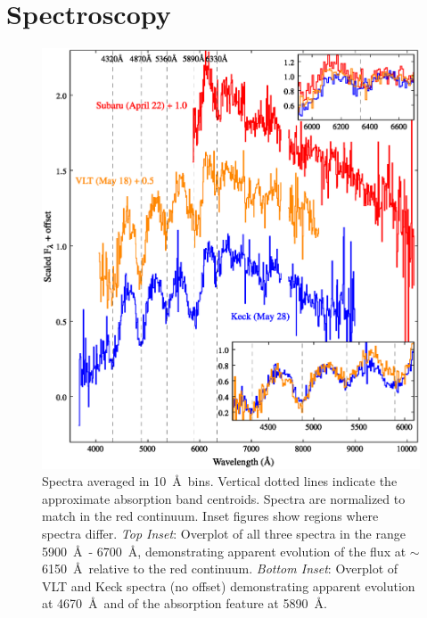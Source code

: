 \section{Spectroscopy} \label{sec:f6_spec}

\begin{figure}
\begin{center}
\includegraphics[width=\textwidth]{figures/scp06f6/spectra.eps}
\end{center}
\caption[Spectroscopy of SN SCP06F6]{Spectra averaged in
  10~\AA\ bins. Vertical dotted lines indicate the approximate
  absorption band centroids. Spectra are normalized to match in the
  red continuum. Inset figures show regions where spectra differ.
  \emph{Top Inset}: Overplot of all three spectra in the range
  5900~\AA\ - 6700~\AA, demonstrating apparent evolution of the flux
  at $\sim$6150~\AA\ relative to the red continuum.  \emph{Bottom
    Inset}: Overplot of VLT and Keck spectra (no offset) demonstrating
  apparent evolution at 4670~\AA\ and of the absorption feature at
  5890~\AA.\label{fig:spectra}}
\end{figure}

